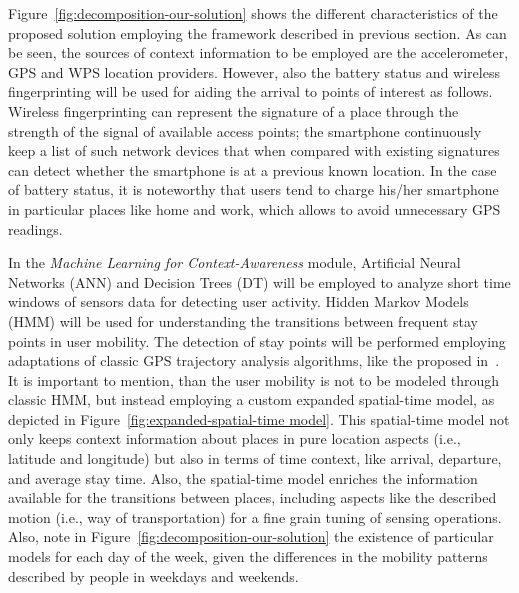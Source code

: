 \documentclass[ENG,PhD]{cinvestav}
\begin{document}
Figure~\ref{fig:decomposition-our-solution} shows the different characteristics of the proposed solution employing the framework described in previous section.
As can be seen, the sources of context information to be employed are the accelerometer, GPS and WPS location providers.
However, also the battery status and wireless fingerprinting will be used for aiding the arrival to points of interest as follows.
Wireless fingerprinting can represent the signature of a place through the strength of the signal of available access points; the smartphone continuously keep a list of such network devices that when compared with existing signatures can detect whether the smartphone is at a previous known location.
In the case of battery status, it is noteworthy that users tend to charge his/her smartphone in particular places like home and work, which allows to avoid unnecessary GPS readings.

In the \emph{Machine Learning for Context-Awareness} module, Artificial Neural Networks (ANN) and Decision Trees (DT) will be employed to analyze short time windows of sensors data for detecting user activity.
Hidden Markov Models (HMM) will be used for understanding the transitions between frequent stay points in user mobility.
The detection of stay points will be performed employing adaptations of classic GPS trajectory analysis algorithms, like the proposed in~\cite{Montoliu2010}.
It is important to mention, than the user mobility is not to be modeled through classic HMM, but instead employing a custom expanded spatial-time model, as depicted in Figure~\ref{fig:expanded-spatial-time model}.
This spatial-time model not only keeps context information about places in pure location aspects (i.e., latitude and longitude) but also in terms of time context, like arrival, departure, and average stay time.
Also, the spatial-time model enriches the information available for the transitions between places, including aspects like the described motion (i.e., way of transportation) for a fine grain tuning of sensing operations.
Also, note in Figure~\ref{fig:decomposition-our-solution} the existence of particular models for each day of the week, given the differences in the mobility patterns described by people in weekdays and weekends.
\end{document}
